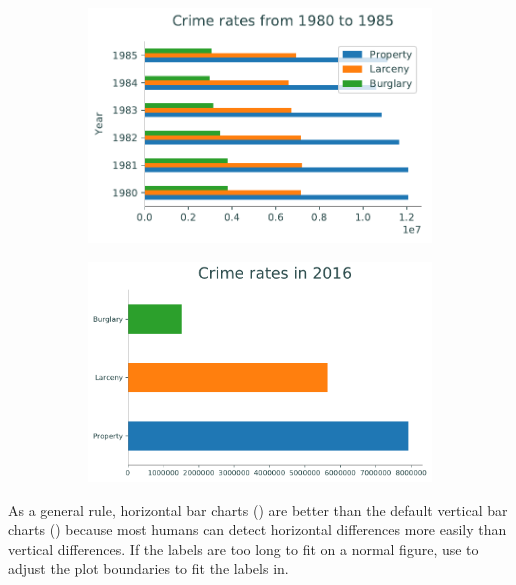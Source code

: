 \begin{figure}[H] %
\captionsetup[subfigure]{justification=centering}
\centering
\begin{subfigure}{.49\textwidth}
    \includegraphics[width=\textwidth]{figures/bar_multi.pdf}
\end{subfigure}
%
\begin{subfigure}{.49\textwidth}
    \includegraphics[width=\textwidth]{figures/bar_single.pdf}
\end{subfigure}
\end{figure}

\begin{info} %
As a general rule, horizontal bar charts () are better than the default vertical bar charts () because most humans can detect horizontal differences more easily than vertical differences.
If the labels are too long to fit on a normal figure, use  to adjust the plot boundaries to fit the labels in.
\end{info}

